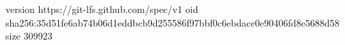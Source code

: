 version https://git-lfs.github.com/spec/v1
oid sha256:35d51fe6ab74b06d1eddbcb9d255586f97bbf0c6ebdace0e90406fd8e5688d58
size 309923
